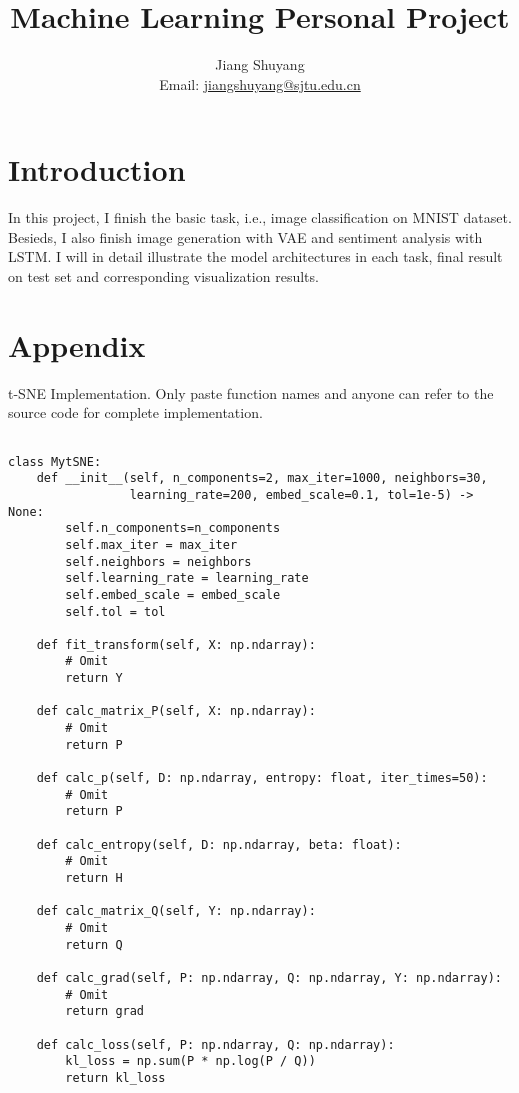 \documentclass{article}
\title{Machine Learning Personal Project}
\author{Jiang Shuyang \\ Email: \href{mailto:jiangshuyang@sjtu.edu.cn}{jiangshuyang@sjtu.edu.cn}}
\begin{document}
\maketitle

\section{Introduction}
In this project, I finish the basic task, i.e., image classification on MNIST dataset. Besieds, I also finish image generation with VAE and sentiment analysis with LSTM. I will in detail illustrate the model architectures in each task, final result on test set and corresponding visualization results.








\newpage
\section{Appendix}
\label{code:tsne}
t-SNE Implementation. Only paste function names and anyone can refer to the source code for complete implementation.
\begin{lstlisting}

class MytSNE:
    def __init__(self, n_components=2, max_iter=1000, neighbors=30,
                 learning_rate=200, embed_scale=0.1, tol=1e-5) -> None:
        self.n_components=n_components
        self.max_iter = max_iter
        self.neighbors = neighbors
        self.learning_rate = learning_rate
        self.embed_scale = embed_scale
        self.tol = tol
    
    def fit_transform(self, X: np.ndarray):
        # Omit
        return Y

    def calc_matrix_P(self, X: np.ndarray):
        # Omit
        return P
    
    def calc_p(self, D: np.ndarray, entropy: float, iter_times=50):
        # Omit
        return P

    def calc_entropy(self, D: np.ndarray, beta: float):
        # Omit
        return H
    
    def calc_matrix_Q(self, Y: np.ndarray):
        # Omit
        return Q
    
    def calc_grad(self, P: np.ndarray, Q: np.ndarray, Y: np.ndarray):
        # Omit
        return grad

    def calc_loss(self, P: np.ndarray, Q: np.ndarray):
        kl_loss = np.sum(P * np.log(P / Q))
        return kl_loss
        
\end{lstlisting}
\end{document}
